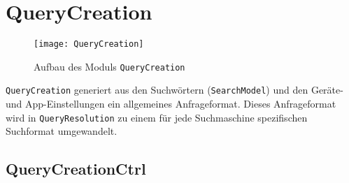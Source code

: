 
\section{QueryCreation}

\begin{figure}[htb]
   \centering
  	\texttt{[image: QueryCreation]}
  	\caption{Aufbau des Moduls \lstinline|QueryCreation|}
	\label{fig:Aufbau des Moduls \lstinline|QueryCreation|}
\end{figure}
\lstinline|QueryCreation| generiert aus den Suchwörtern (\lstinline|SearchModel|) und den Geräte- und App-Einstellungen ein allgemeines Anfrageformat. Dieses Anfrageformat wird in \lstinline|QueryResolution| zu einem für jede Suchmaschine spezifischen Suchformat umgewandelt.

\subsection{QueryCreationCtrl}

